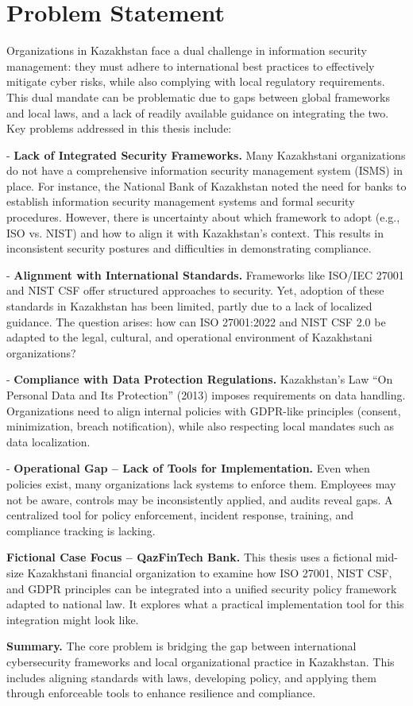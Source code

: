 \chapter{Problem Statement}

\noindent\hspace{2em}Organizations in Kazakhstan face a dual challenge in information security management: they must adhere to international best practices to effectively mitigate cyber risks, while also complying with local regulatory requirements. This dual mandate can be problematic due to gaps between global frameworks and local laws, and a lack of readily available guidance on integrating the two. Key problems addressed in this thesis include:

- \textbf{Lack of Integrated Security Frameworks.} Many Kazakhstani organizations do not have a comprehensive information security management system (ISMS) in place. For instance, the National Bank of Kazakhstan noted the need for banks to establish information security management systems and formal security procedures. However, there is uncertainty about which framework to adopt (e.g., ISO vs. NIST) and how to align it with Kazakhstan’s context. This results in inconsistent security postures and difficulties in demonstrating compliance.

- \textbf{Alignment with International Standards.} Frameworks like ISO/IEC 27001 and NIST CSF offer structured approaches to security. Yet, adoption of these standards in Kazakhstan has been limited, partly due to a lack of localized guidance. The question arises: how can ISO 27001:2022 and NIST CSF 2.0 be adapted to the legal, cultural, and operational environment of Kazakhstani organizations?

- \textbf{Compliance with Data Protection Regulations.} Kazakhstan’s Law “On Personal Data and Its Protection” (2013) imposes requirements on data handling. Organizations need to align internal policies with GDPR-like principles (consent, minimization, breach notification), while also respecting local mandates such as data localization.

- \textbf{Operational Gap – Lack of Tools for Implementation.} Even when policies exist, many organizations lack systems to enforce them. Employees may not be aware, controls may be inconsistently applied, and audits reveal gaps. A centralized tool for policy enforcement, incident response, training, and compliance tracking is lacking.

\textbf{Fictional Case Focus – QazFinTech Bank.}  
This thesis uses a fictional mid-size Kazakhstani financial organization to examine how ISO 27001, NIST CSF, and GDPR principles can be integrated into a unified security policy framework adapted to national law. It explores what a practical implementation tool for this integration might look like.

\textbf{Summary.}  
The core problem is bridging the gap between international cybersecurity frameworks and local organizational practice in Kazakhstan. This includes aligning standards with laws, developing policy, and applying them through enforceable tools to enhance resilience and compliance.
